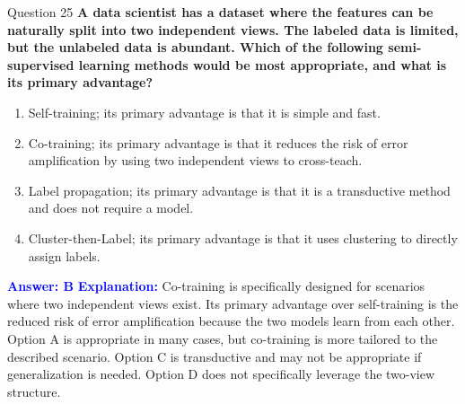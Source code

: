 \documentclass{beamer}
\begin{document}
	\begin{frame}{Question 25}
		\textbf{A data scientist has a dataset where the features can be naturally split into two independent views. The labeled data is limited, but the unlabeled data is abundant. Which of the following semi-supervised learning methods would be most appropriate, and what is its primary advantage?}
		\begin{enumerate}
			\item Self-training; its primary advantage is that it is simple and fast.
			\item Co-training; its primary advantage is that it reduces the risk of error amplification by using two independent views to cross-teach.
			\item Label propagation; its primary advantage is that it is a transductive method and does not require a model.
			\item Cluster-then-Label; its primary advantage is that it uses clustering to directly assign labels.
		\end{enumerate}
		\vspace{0.2cm}
		\textcolor{blue}{\textbf{Answer: B}}
		\vspace{0.2cm}
		\textcolor{blue}{\textbf{Explanation:}} Co-training is specifically designed for scenarios where two independent views exist. Its primary advantage over self-training is the reduced risk of error amplification because the two models learn from each other. Option A is appropriate in many cases, but co-training is more tailored to the described scenario. Option C is transductive and may not be appropriate if generalization is needed. Option D does not specifically leverage the two-view structure.
	\end{frame}
	
\end{document}
